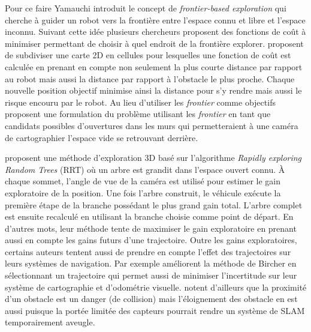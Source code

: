 Pour ce faire Yamauchi introduit le concept de \textit{frontier-based exploration} qui cherche à guider un robot vers la frontière entre l'espace connu et libre et l'espace inconnu. Suivant cette idée plusieurs chercheurs proposent des fonctions de coût à minimiser permettant de choisir à quel endroit de la frontière explorer. \citep{Wirth2007} proposent de subdiviser une carte 2D en cellules pour lesquelles une fonction de coût est calculée en prenant en compte non seulement la plus courte distance par rapport au robot mais aussi la distance par rapport à l'obstacle le plus proche. Chaque nouvelle position objectif minimise ainsi la distance pour s'y rendre mais aussi le risque encouru par le robot. Au lieu d'utiliser les \textit{frontier} comme objectifs \citep{Dornhege2011} proposent une formulation du problème utilisant les \textit{frontier} en tant que candidats possibles d'ouvertures dans les murs qui permetteraient à une caméra de cartographier l'espace vide se retrouvant derrière.

\citep{Bircher2016} proposent une méthode d'exploration 3D basé sur l'algorithme \textit{Rapidly exploring Random Trees} (RRT) où un arbre est grandit dans l'espace ouvert connu. À chaque sommet, l'angle de vue de la caméra est utilisé pour estimer le gain exploratoire de la position. Une fois l'arbre construit, le véhicule exécute la première étape de la branche possédant le plus grand gain total. L'arbre complet est ensuite recalculé en utilisant la branche choisie comme point de départ. En d'autres mots, leur méthode tente de maximiser le gain exploratoire en prenant aussi en compte les gains futurs d'une trajectoire. Outre les gains exploratoires, certains auteurs tentent aussi de prendre en compte l'effet des trajectoires sur leurs systèmes de navigation. Par exemple \citep{Papachristos2017} améliorent la méthode de Bircher en sélectionnant un trajectoire qui permet aussi de minimiser l'incertitude sur leur système de cartographie et d'odométrie visuelle. \citep{Wirth2007} notent d'ailleurs que la proximité d'un obstacle est un danger (de collision) mais l'éloignement des obstacle en est aussi puisque la portée limitée des capteurs pourrait rendre un système de SLAM temporairement aveugle.

